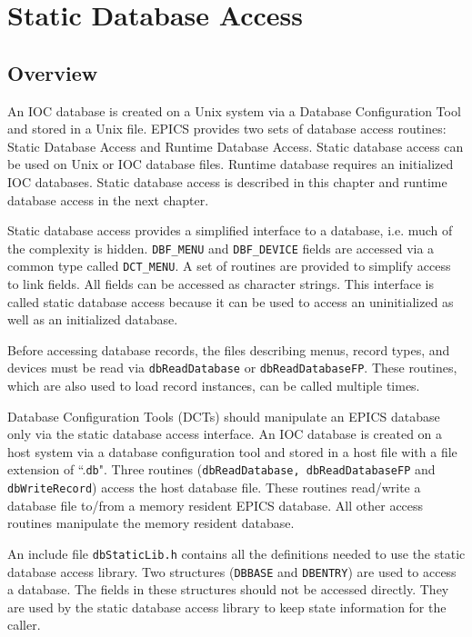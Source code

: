 





\chapter{Static Database Access}

\section{Overview}

An IOC database is created on a Unix system via a Database Configuration Tool and stored in a Unix file. EPICS provides 
two sets of database access routines: Static Database Access and Runtime Database Access. Static database access can be 
used on Unix or IOC database files. Runtime database requires an initialized IOC databases. Static database access is 
described in this chapter and runtime database access in the next chapter.

Static database access provides a simplified interface to a database, i.e. much of the complexity is hidden. \verb|DBF_MENU| and 
\verb|DBF_DEVICE| fields are accessed via a common type called \verb|DCT_MENU|. A set of routines are provided to simplify access 
to link fields. All fields can be accessed as character strings. This interface is called static database access because it can 
be used to access an uninitialized as well as an initialized database.

Before accessing database records, the files describing menus, record types, and devices must be read via 
\verb|dbReadDatabase| or \verb|dbReadDatabaseFP|. These routines, which are also used to load record instances, can be 
called multiple times.

Database Configuration Tools (DCTs) should manipulate an EPICS database only via the static database access interface. 
An IOC database is created on a host system via a database configuration tool and stored in a host file with a file 
extension of ``.\verb|db|". Three routines (\verb|dbReadDatabase, dbReadDatabaseFP| and \verb|dbWriteRecord|) access the 
host database file. These routines read/write a database file to/from a memory resident EPICS database. All other access 
routines manipulate the memory resident database.

An include file \verb|dbStaticLib.h| contains all the definitions needed to use the static database access library. Two 
structures (\verb|DBBASE| and \verb|DBENTRY|) are used to access a database. The fields in these structures should not be accessed 
directly. They are used by the static database access library to keep state information for the caller.

